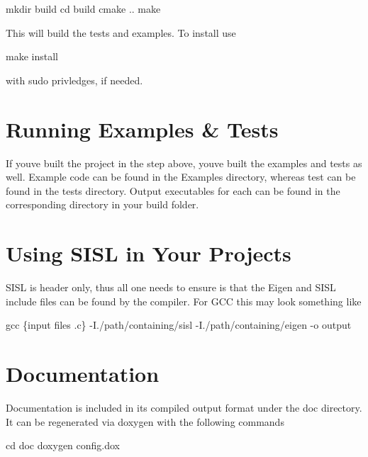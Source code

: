 \begin{DoxyCode}
mkdir build
cd build
cmake ..
make 
\end{DoxyCode}


This will build the tests and examples. To install use 
\begin{DoxyCode}
make install
\end{DoxyCode}
 with sudo privledges, if needed.

\section*{Running Examples \& Tests }

If you\textquotesingle{}ve built the project in the step above, you\textquotesingle{}ve built the examples and tests as well. Example code can be found in the {\ttfamily Examples} directory, whereas test can be found in the {\ttfamily tests} directory. Output executables for each can be found in the corresponding directory in your {\ttfamily build} folder.

\section*{Using S\+I\+SL in Your Projects }

S\+I\+SL is header only, thus all one needs to ensure is that the Eigen and S\+I\+SL include files can be found by the compiler. For G\+CC this may look something like 
\begin{DoxyCode}
gcc \{input files .c\} -I./path/containing/sisl -I./path/containing/eigen -o output
\end{DoxyCode}


\section*{Documentation }

Documentation is included in its compiled output format under the {\ttfamily doc} directory. It can be regenerated via doxygen with the following commands


\begin{DoxyCode}
cd doc
doxygen config.dox
\end{DoxyCode}
 